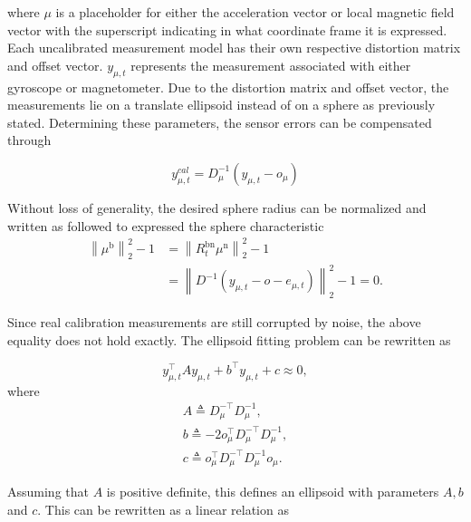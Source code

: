 where $\mu$ is a placeholder for either the acceleration vector or local magnetic field vector with the superscript indicating in what coordinate frame it is expressed. Each uncalibrated measurement model has their own respective distortion matrix and offset vector. $y_{\mu, t}$ represents the measurement associated with either gyroscope or magnetometer.
Due to the distortion matrix and offset vector, the measurements lie on a translate ellipsoid instead of on a sphere as previously stated. Determining these parameters, the sensor errors can be compensated through

\begin{equation}
	y_{\mu, t}^{cal}=D_\mu^{-1}\left(y_{\mu, t}-o_{\mu}\right)
	\label{eq:calibration}
\end{equation}

Without loss of generality, the desired sphere radius can be normalized and written as followed to expressed the sphere characteristic
\begin{equation}
	\begin{aligned}
		\left\|\mu^{\mathrm{b}}\right\|_{2}^{2}-1 &=\left\|R_{t}^{\mathrm{bn}} \mu^{\mathrm{n}}\right\|_{2}^{2}-1 \\
		&=\left\|D^{-1}\left(y_{\mu, t}-o-e_{\mu, t}\right)\right\|_{2}^{2}-1=0.
	\end{aligned}
\end{equation}

Since real calibration measurements are still corrupted by noise, the above equality does not hold exactly. The ellipsoid fitting problem can be rewritten as

\begin{equation}
	\label{eq:calib_elipsoid}
	y_{\mu, t}^{\top} A y_{\mu, t}+b^{\top} y_{\mu, t}+c \approx 0,
\end{equation}
where
\begin{subequations}
	\label{eq:calib_elipsoid_components}
	\begin{align}
		A \triangleq D_\mu^{-\top} D_\mu^{-1}, \\
		b \triangleq-2 o_\mu^{\top} D_\mu^{-\top} D_\mu^{-1}, \\
		c \triangleq o_\mu^{\top} D_\mu^{-\top} D_\mu^{-1} o_\mu.
	\end{align}
\end{subequations}

Assuming that $A$ is positive definite, this defines an ellipsoid with parameters $A, b$ and $c$. This can be rewritten as a linear relation as

